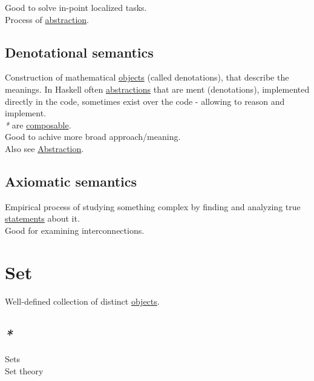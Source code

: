 \documentclass[a4paper,14pt,oneside]{book}
\begin{document}
Good to solve in-point localized tasks.\\

Process of \hyperref[orgb4a6914]{abstraction}.\\

\section{\label{orgf995546}Denotational semantics}
\label{sec:org6f23b5f}
Construction of mathematical \hyperref[org22f7883]{objects} (called denotations), that describe the meanings. In Haskell often \hyperref[org5d58e45]{abstractions} that are ment (denotations), implemented directly in the code, sometimes exist over the code - allowing to reason and implement.\\

\emph{*} are \hyperref[org51db08c]{composable}.\\

Good to achive more broad approach/meaning.\\

Also see \hyperref[orgb4a6914]{Abstraction}.\\

\section{\label{orgbe538bf}Axiomatic semantics}
\label{sec:org33c3ba8}
Empirical process of studying something complex by finding and analyzing true \hyperref[org1db31d8]{statements} about it.\\

Good for examining interconnections.\\

\chapter{\label{orge119629}Set}
\label{sec:org7e33567}
Well-defined collection of distinct \hyperref[org22f7883]{objects}.\\

\section{\emph{*}}
\label{sec:org3937165}

\label{org1faae0f}Sets\\
\label{orgc58b261}Set theory\\
\end{document}
